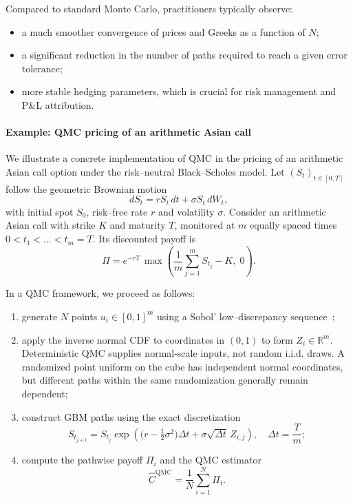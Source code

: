 Compared to standard Monte Carlo, practitioners typically observe:
\begin{itemize}
    \item a much smoother convergence of prices and Greeks as a function of $N$;
    \item a significant reduction in the number of paths required to reach a given error tolerance;
    \item more stable hedging parameters, which is crucial for risk management and P\&L attribution.
\end{itemize}

\paragraph{Example: QMC pricing of an arithmetic Asian call}

We illustrate a concrete implementation of QMC in the pricing of an arithmetic Asian call option under the risk--neutral Black--Scholes model. Let $(S_t)_{t\in[0,T]}$ follow the geometric Brownian motion
\[
dS_t = r S_t\,dt + \sigma S_t\,dW_t,
\]
with initial spot $S_0$, risk--free rate $r$ and volatility $\sigma$.  
Consider an arithmetic Asian call with strike $K$ and maturity $T$, monitored at $m$ equally spaced times $0 < t_1 < \dots < t_m = T$. Its discounted payoff is
\[
\Pi = e^{-rT}\,\max\!\left( \frac{1}{m}\sum_{j=1}^m S_{t_j} - K,\;0 \right).
\]

In a QMC framework, we proceed as follows:
\begin{enumerate}
    \item generate $N$ points $u_i \in [0,1]^m$ using a Sobol' low--discrepancy sequence~\cite{Sobol1967};
    \item apply the inverse normal CDF to coordinates in $(0,1)$ to form
          $Z_i\in\mathbb R^m$.
          Deterministic QMC supplies normal-scale inputs, not random
          i.i.d. draws. A randomized point uniform on the cube has
          independent normal coordinates, but different paths within
          the same randomization generally remain dependent;
    \item construct GBM paths using the exact discretization
    \[
    S_{t_{j+1}} = S_{t_j} \exp\!\left( \bigl(r - \tfrac{1}{2}\sigma^2\bigr)\Delta t + \sigma \sqrt{\Delta t}\,Z_{i,j} \right), 
    \quad \Delta t = \frac{T}{m};
    \]
    \item compute the pathwise payoff $\Pi_i$ and the QMC estimator
    \[
    \widehat{C}^{\mathrm{QMC}} = \frac{1}{N}\sum_{i=1}^N \Pi_i.
    \]
\end{enumerate}

